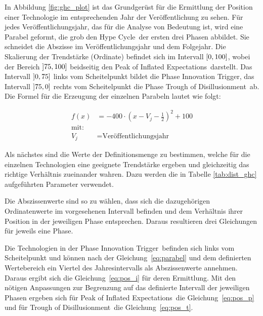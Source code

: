 In Abbildung \ref{fig:ghc_plot} ist das Grundgerüst für die Ermittlung der Position einer Tech\-no\-lo\-gie im ent\-sprechen\-den Jahr der Veröffentlichung zu sehen. Für jedes Ver\-öf\-fent\-li\-chungs\-jahr, das für die Analyse von Bedeutung ist, wird eine Parabel geformt, die grob den \glqq Hype Cycle\grqq~der ersten drei Phasen abbildet. Sie schneidet die Abszisse im Veröffentlichungsjahr und dem Folgejahr. Die Skalierung der Trendstärke (Ordinate) befindet sich im Intervall $\interval{0}{100}$, wobei der Bereich $\interval[open left]{75}{100}$ beidseitig den \glqq Peak of Inflated Expectations\grqq~darstellt. Das Intervall $\interval[open left]{0}{75}$ links vom Scheitelpunkt bildet die Phase \glqq Innovation Trigger\grqq, das Intervall $\interval[open left]{75}{0}$ rechts vom Scheitelpunkt die Phase \glqq Trough of Disillusionment\grqq~ab. Die Formel für die Erzeugung der einzelnen Parabeln lautet wie folgt:

\begin{align}
f(x) &= -400 \cdot \left( x - V_j - \frac{1}{2} \right)^2+100 \label{eq:parabel}\\
\text{mit:}\nonumber\\
V_j &= \text{Veröffentlichungsjahr}\nonumber
\end{align}

Als nächstes sind die Werte der Definitionsmenge zu bestimmen, welche für die einzelnen Technologien eine geeignete Trendstärke ergeben und gleichzeitig das richtige Verhältnis zueinander wahren. Dazu werden die in Tabelle \ref{tab:dist_ghc} aufgeführten Parameter verwendet.

Die Abszissenwerte sind so zu wählen, dass sich die dazugehörigen Ordinatenwerte im vorgesehenen Intervall befinden und dem Verhältnis ihrer Position in der jeweiligen Phase entsprechen. Daraus resultieren drei Gleichungen für jeweils eine Phase.

Die Technologien in der Phase \glqq Innovation Trigger\grqq~befinden sich links vom Scheitelpunkt und können nach der Gleichung~\ref{eq:parabel} und dem definierten Wertebereich ein Viertel des Jahresintervalls als Abszissenwerte annehmen. Daraus ergibt sich die Gleichung~\ref{eq:pos_i} für deren Ermittlung. Mit den nötigen Anpassungen zur Begrenzung auf das definierte Intervall der jeweiligen Phasen ergeben sich für \glqq Peak of Inflated Expectations\grqq~die Gleichung~\ref{eq:pos_p} und für \glqq Trough of Disillusionment\grqq~die Gleichung~\ref{eq:pos_t}.

